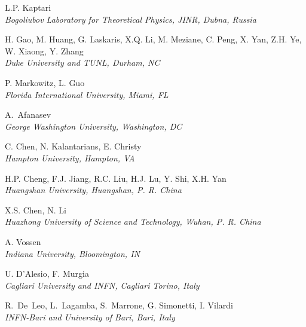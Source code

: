 \documentclass[12pt]{article}
\begin{document}
\begin{center}
\large{L.P. Kaptari}\\
\it{Bogoliubov Laboratory for Theoretical Physics, JINR, Dubna, Russia}
\end{center}

\begin{center}
\large{H. Gao, M. Huang,
 G. Laskaris, X.Q. Li, M. Meziane,
 C. Peng, X. Yan, Z.H. Ye, W. Xiaong, Y. Zhang}\\
\it{Duke University and TUNL, Durham, NC}
\end{center}

\begin{center}
\large{P. Markowitz, L. Guo}\\
\it{Florida International University, Miami, FL}
\end{center}

\begin{center}
\large{A.~Afanasev} \\
\it{George Washington University, Washington, DC}
\end{center}

\begin{center}
\large{C. Chen, N. Kalantarians, E. Christy} \\
\it{Hampton University, Hampton, VA}
\end{center}


\begin{center}
\large{H.P. Cheng, F.J. Jiang, R.C. Liu, H.J. Lu, Y. Shi, X.H. Yan}\\
\it{Huangshan University, Huangshan, P. R. China}
\end{center}

\begin{center}
\large{X.S. Chen, N. Li}\\
\it{Huazhong University of Science and Technology, Wuhan, P. R. China}
\end{center}

\begin{center}
\large{A. Vossen}\\
\it{Indiana University, Bloomington, IN}
\end{center}


\begin{center}
\large{U. D'Alesio, F. Murgia}\\
\it{Cagliari University and INFN, Cagliari Torino, Italy}
\end{center}

\begin{center}
\large{
R.~De~Leo, L.~Lagamba, S.~Marrone, G. Simonetti, I. Vilardi}\\ 
\it{INFN-Bari and University of Bari, Bari, Italy}  
\end{center}
\end{document}
